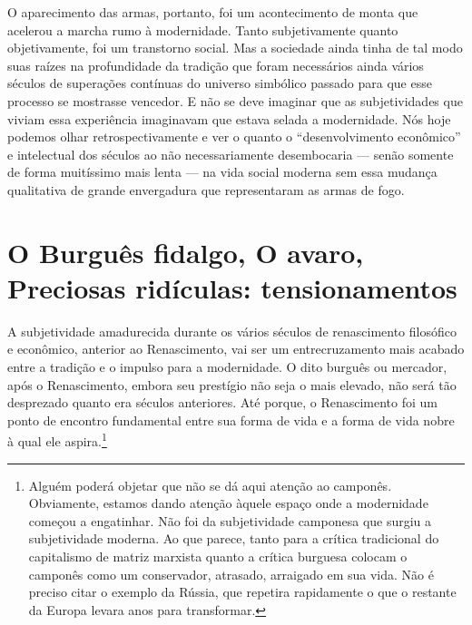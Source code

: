 O aparecimento das armas, portanto, foi um acontecimento de monta que acelerou a marcha
rumo à modernidade. Tanto subjetivamente quanto objetivamente, foi um
transtorno social. Mas a sociedade ainda tinha de tal modo suas raízes
na profundidade da tradição que foram necessários ainda vários séculos
de superações contínuas do universo simbólico passado para que esse
processo se mostrasse vencedor. E não se deve imaginar que as
subjetividades que viviam essa experiência imaginavam que estava selada
a modernidade. Nós hoje podemos olhar retrospectivamente e ver o quanto
o ``desenvolvimento econômico'' e intelectual dos séculos  ao  não
necessariamente desembocaria --- senão somente de forma muitíssimo mais lenta
--- na vida social moderna sem essa mudança qualitativa de grande
envergadura que representaram as armas de fogo.

\section{O Burguês fidalgo, O avaro, Preciosas ridículas: tensionamentos}

A subjetividade amadurecida durante os vários séculos de
renascimento filosófico e econômico, anterior ao
Renascimento, vai ser um entrecruzamento mais acabado entre a tradição e
o impulso para a modernidade. O dito burguês ou mercador, após o
Renascimento, embora seu prestígio não seja o mais elevado, não será tão
desprezado quanto era séculos anteriores. Até porque, o Renascimento foi
um ponto de encontro fundamental entre sua forma de vida e a forma de
vida nobre à qual ele aspira.\footnote{Alguém poderá objetar que não se
  dá aqui atenção ao camponês. Obviamente, estamos dando atenção àquele
  espaço onde a modernidade começou a engatinhar. Não foi da
  subjetividade camponesa que surgiu a subjetividade moderna. Ao que
  parece, tanto para a crítica tradicional do capitalismo de matriz
  marxista quanto a crítica burguesa colocam o camponês como um
  conservador, atrasado, arraigado em sua vida. Não é preciso citar o
  exemplo da Rússia, que repetira rapidamente o que o restante da Europa
  levara anos para transformar.}

